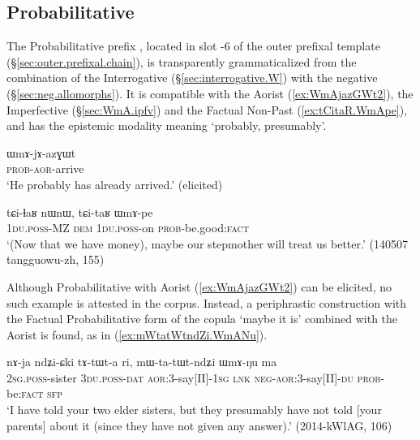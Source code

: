 \subsection{Probabilitative} \label{sec:WmA}
The Probabilitative prefix , located in slot -6 of the outer prefixal template (§\ref{sec:outer.prefixal.chain}), is transparently grammaticalized from the combination of the Interrogative  (§\ref{sec:interrogative.W}) with the negative  (§\ref{sec:neg.allomorphs}). It is compatible with the Aorist  (\ref{ex:WmAjazGWt2}), the Imperfective (§\ref{sec:WmA.ipfv}) and the Factual Non-Past (\ref{ex:tCitaR.WmApe}), and has the epistemic modality meaning `probably, presumably'.

 \begin{exe}
 \ex \label{ex:WmAjazGWt2}
\gll ɯmɤ-jɤ-azɣɯt  \\
\textsc{prob}-\textsc{aor}-arrive \\
\glt `He probably has already arrived.' (elicited)
\end{exe}

 \begin{exe}
 \ex \label{ex:tCitaR.WmApe}
\gll tɕi-ɬaʁ nɯnɯ, tɕi-taʁ ɯmɤ-pe \\
\textsc{1du}.\textsc{poss}-MZ \textsc{dem} \textsc{1du}.\textsc{poss}-on \textsc{prob}-be.good:\textsc{fact} \\
\glt `(Now that we have money), maybe our stepmother will treat us better.' (140507 tangguowu-zh, 155)
\end{exe}

Although Probabilitative with Aorist (\ref{ex:WmAjazGWt2}) can be elicited, no such example is attested in the corpus. Instead, a periphrastic construction with the Factual Probabilitative form of the copula  `maybe it is' combined with the Aorist is found, as in (\ref{ex:mWtatWtndZi.WmANu}).
 
 \begin{exe}
 \ex \label{ex:mWtatWtndZi.WmANu}
\gll nɤ-ja ndʑi-ɕki tɤ-tɯt-a ri, mɯ-ta-tɯt-ndʑi ɯmɤ-ŋu ma \\
\textsc{2sg}.\textsc{poss}-sister \textsc{3du}.\textsc{poss}-\textsc{dat} \textsc{aor}:3\flobv{}-say[II]-\textsc{1sg} \textsc{lnk} \textsc{neg}-\textsc{aor}:3\flobv{}-say[II]-\textsc{du} \textsc{prob}-be:\textsc{fact} \textsc{sfp} \\
\glt `I have told your two elder sisters, but they presumably have not told [your parents] about it (since they have not given any answer).' (2014-kWlAG, 106)
\end{exe}

